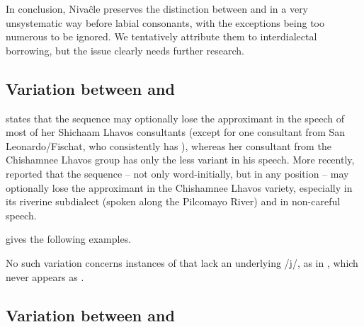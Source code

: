 \begin{exe}
    \ex \wing
    \ex \flower
    \ex \lick
    \ex \shoulderblade \label{ni-a-ao-shoulderblade}
    \ex \smooth
    \ex \spring \label{ni-a-ao-spring}
    \ex \wolf
    \ex \rat
    \ex \jararaca
    \ex \peccary
\end{exe}

In conclusion, Nivaĉle preserves the distinction between  and  in a very unsystematic way before labial consonants, with the exceptions being too numerous to be ignored. We tentatively attribute them to interdialectal borrowing, but the issue clearly needs further research.

\subsection{Variation between  and }\label{ni-yi-i}

\citet[534--535]{NS87} states that the sequence  may optionally lose the approximant  in the speech of most of her Shichaam Lhavos consultants (except for one consultant from San Leonardo/Fischat, who consistently has ), whereas her consultant from the Chishamnee Lhavos group has only the less variant in his speech. More recently, \citet[49]{LC20} reported that the sequence  -- not only word-initially, but in any position -- may optionally lose the approximant  in the Chishamnee Lhavos variety, especially in its riverine subdialect (spoken along the Pilcomayo River) and in non-careful speech.

\citet[173, 498, 514, 521, 531]{NS87} gives the following examples.

\ea
    \begin{xlist}
        \ex {} \recind {}
        \ex {} \recind {}
        \ex {} \recind {}
        \ex {} \recind {}
        \ex {} \recind {}
    \end{xlist}
\z

No such variation concerns instances of  that lack an underlying /j/, as in , which never appears as . 

\subsection{Variation between  and }\label{ni-wu-u}

